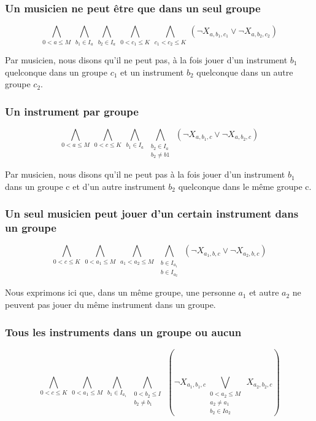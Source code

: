 \documentclass[11pt]{article}
\begin{document}
\subsubsection{Un musicien ne peut être que dans un seul groupe}

$$\bigwedge\limits_{0<a\le M}\ \bigwedge\limits_{b_1\in I_a}\ \bigwedge\limits_{b_2\in I_a}\ \bigwedge\limits_{0<c_1\le K}\ \bigwedge\limits_{c_1<c_2\le K}\ \left(\neg X_{a,b_1,c_1} \vee \neg X_{a,b_2,c_2}\right)$$

Par musicien, nous disons qu'il ne peut pas, à la fois jouer d'un instrument $b_1$ quelconque dans un groupe $c_1$ et un instrument $b_2$ quelconque dans un autre groupe $c_2$.

\subsubsection{Un instrument par groupe}

$$\bigwedge\limits_{0<a\le M}\ \bigwedge\limits_{0<c\le K}\ \bigwedge\limits_{b_1\in I_a}\ \bigwedge\limits_{\substack{b_2\in I_a \\ b_2 \ne b1}}\ \left(\neg X_{a,b_1,c} \vee \neg X_{a,b_2,c}\right)$$

Par musicien, nous disons qu'il ne peut pas à la fois jouer d'un instrument $b_1$ dans un groupe c et d'un autre instrument $b_2$ quelconque dans le même groupe c.

\subsubsection{Un seul musicien peut jouer d'un certain instrument dans un groupe}

$$\bigwedge\limits_{0<c\le K}\ \bigwedge\limits_{0<a_1\le M}\ \bigwedge\limits_{a_1<a_2\le M}\ \bigwedge\limits_{\substack{b\in I_{a_1} \\ b\in I_{a_2}}}\ \left(\neg X_{a_1,b,c} \vee \neg X_{a_2,b,c}\right)$$

Nous exprimons ici que, dans un même groupe, une personne $a_1$ et autre $a_2$ ne peuvent pas jouer du même instrument dans un groupe.

\subsubsection{Tous les instruments dans un groupe ou aucun}

$$\bigwedge\limits_{0<c\le K}\ \bigwedge\limits_{0<a_1\le M}\ \bigwedge\limits_{b_1\in I_{a_1}}\ \bigwedge\limits_{\substack{0<b_2\le I \\ b_2 \ne b_1}}\ \left(\neg X_{a_1,b_1,c} \bigvee\limits_{\substack{0<a_2\le M \\ a_2 \ne a_1 \\ b_2 \in I{a_2}}}\ X_{a_2,b_2,c}\right)$$
\end{document}
